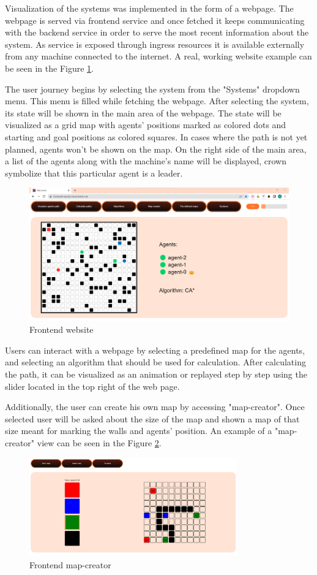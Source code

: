 Visualization of the systems was implemented in the form of a webpage. The webpage is served via frontend service and once fetched it keeps communicating with the backend service in order to serve the most recent information about the system. As service is exposed through ingress resources it is available externally from any machine connected to the internet. A real, working website example can be seen in the Figure \ref{fig:frontend}.

The user journey begins by selecting the system from the "Systems" dropdown menu. This menu is filled  while fetching the webpage. After selecting the system, its state will be shown in the main area of the webpage. The state will be visualized as a grid map with agents' positions marked as colored dots and starting and goal positions as colored squares. In cases where the path is not yet planned, agents won't be shown on the map. On the right side of the main area, a list of the agents along with the machine's name will be displayed, crown symbolize that this particular agent is a leader.

\begin{figure}[H]
    \centering
    \includegraphics[width=\textwidth]{pictures/frontend.png}
    \caption{Frontend website} 
    \label{fig:frontend}
\end{figure}

Users can interact with a webpage by selecting a predefined map for the agents, and selecting an algorithm that should be used for calculation. After calculating the path, it can be visualized as an animation or replayed step by step using the slider located in the top right of the web page.

Additionally, the user can create his own map by accessing "map-creator". Once selected user will be asked about the size of the map and shown a map of that size meant for marking the walls and agents' position. An example of a "map-creator" view can be seen in the Figure \ref{fig:map-creator}.

\begin{figure}[H]
    \centering
    \includegraphics[width=0.8\textwidth]{pictures/map-creator.png}
    \caption{Frontend map-creator} 
    \label{fig:map-creator}
\end{figure}